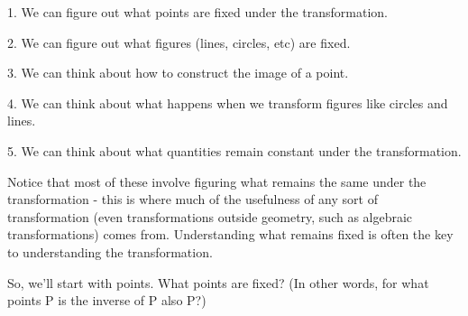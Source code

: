 
1. We can figure out what points are fixed under the transformation. 


2. We can figure out what figures (lines, circles, etc) are fixed.


3. We can think about how to construct the image of a point.


4. We can think about what happens when we transform figures like circles and lines.


5. We can think about what quantities remain constant under the transformation.

\begin{remark}
Notice that most of these involve figuring what remains the same under the transformation - this is where much of the usefulness of any sort of transformation (even transformations outside geometry, such as algebraic transformations) comes from.  Understanding what remains fixed is often the key to understanding the transformation.    
\end{remark}

So, we'll start with points.  What points are fixed?  (In other words, for what points P is the inverse of P also P?)










